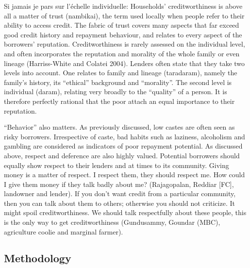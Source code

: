 \documentclass[a4paper, 11pt, onecolumn]{article}
\begin{document}



\cite{Guerin2014a} Si jamais je pars sur l'échelle individuelle: Households’ creditworthiness is above all a matter of trust (nambikai), the term used locally
when people refer to their ability to access credit. The fabric of trust covers many aspects that
far exceed good credit history and repayment behaviour, and relates to every aspect of the
borrowers’ reputation. Creditworthiness is rarely assessed on the individual level, and often
incorporates the reputation and morality of the whole family or even lineage (Harriss-White
and Colatei 2004). Lenders often state that they take two levels into account. One relates to
family and lineage (taradaram), namely the family’s history, its “ethical” background and
“morality”. The second level is individual (daram), relating very broadly to the “quality” of a
person. It is therefore perfectly rational that the poor attach an equal importance to their
reputation.

“Behavior” also matters. As previously discussed, low castes are often seen as risky
borrowers. Irrespective of caste, bad habits such as laziness, alcoholism and gambling are
considered as indicators of poor repayment potential. As discussed above, respect and deference are also highly valued. Potential borrowers should equally show respect to their
lenders and at times to its community.
Giving money is a matter of respect. I respect them, they should respect me. How could I give them
money if they talk badly about me? (Rajagopalan, Reddiar [FC], landowner and lender).
If you don’t want credit from a particular community, then you can talk about them to others; otherwise
you should not criticize. It might spoil creditworthiness. We should talk respectfully about these people,
this is the only way to get creditworthiness (Gundusammy, Goundar (MBC), agriculture coolie and
marginal farmer).

	\subsection{Methodology} \label{subsection:methodology}
\end{document}
